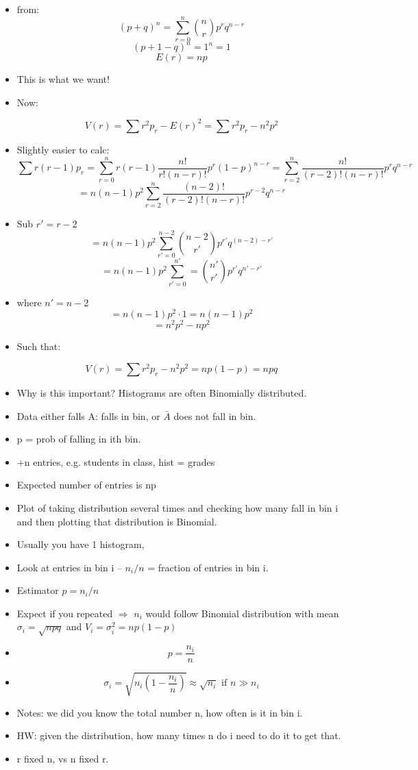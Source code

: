 \begin{itemize}
    \item from:
    \[ (p+q)^n = \sum_{r=0}^n \binom{n}{r} p^r q^{n-r} \]
    \[ (p+1-q)^n = 1^n = 1 \]
    \[ E(r) = np \]
    \item This is what we want!
    \item Now:
    
    \[ V(r) = \sum r^2 p_r -E(r)^2 = \sum r^2 p_r - n^2 p^2 \]
    \item Slightly easier to calc:
    \[ \sum r(r-1) p_r = \sum_{r=0}^n r(r-1) \frac{n!}{r!(n-r)!} p^r (1-p)^{n-r} = \sum_{r=2}^n \frac{n!}{(r-2)!(n-r)!} p^r q^{n-r} \]
    \[ = n(n-1) p^2 \sum_{r=2}^n \frac{(n-2)!}{(r-2)!(n-r)!} p^{r-2} q^{n-r} \]
    \item Sub $r' = r-2$
    \[ = n(n-1) p^2 \sum_{r'=0}^{n-2} \binom{n-2}{r'} p^{r'} q^{(n-2)-r'} \]
    \[ = n(n-1) p^2 \sum_{r'=0}^{n'} = \binom{n'}{r'} p^{r'} q^{n'-r'} \]
    \item where $n' = n-2$
    \[ = n(n-1)p^2 \cdot 1 = n(n-1)p^2 \]
    \[ = n^2 p^2 - np^2 \]
    \item Such that:
    
    \[ \boxed{V(r) = \sum r^2 p_r - n^2 p^2 }= np ( 1 - p) = npq \]

    \item Why is this important? Histograms are often Binomially distributed.
    \item Data either falls A: falls in bin, or $\bar{A}$ does not fall in bin.
    \item p = prob of falling in ith bin.
    \item +n entries, e.g. students in class, hist = grades
    \item Expected number of entries is np
    \item Plot of taking distribution several times and checking how many fall in bin i and then plotting that distribution is Binomial.
    \item Usually you have 1 histogram,
    \item Look at entries in bin i -- $n_i/n$ = fraction of entries in bin i.
    \item Estimator $p=n_i/n$
    \item Expect if you repeated $\Rightarrow$ $n_i$ would follow Binomial distribution with mean $\sigma_i = \sqrt{n p q}$ and $V_i = \sigma^2_i = np ( 1-p)$
    \item \[ p = \frac{n_i}{n} \]
    \item \[ \boxed{\sigma_i = \sqrt{n_i \left(1 - \frac{n_i}{n}\right)}} \approx \sqrt{n_i} \text{ if } n \gg n_i \]
    
    \item Notes: we did you know the total number n, how often is it in bin i.
    \item HW: given the distribution, how many times n do i need to do it to get that.
    \item r fixed n, vs n fixed r.
\end{itemize}
